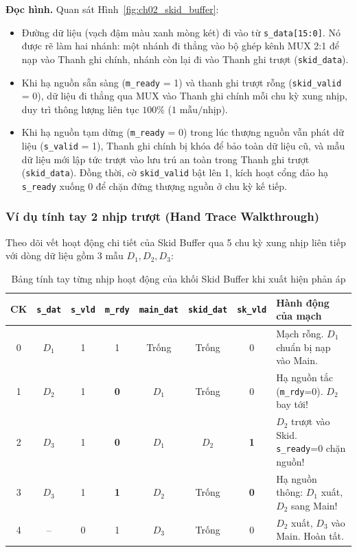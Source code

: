 \textbf{Đọc hình.} Quan sát Hình~\ref{fig:ch02_skid_buffer}:
\begin{itemize}[leftmargin=1.5em, itemsep=2pt]
    \item Đường dữ liệu (vạch đậm màu xanh mòng két) đi vào từ \texttt{s\_data[15:0]}. Nó được rẽ làm hai nhánh: một nhánh đi thẳng vào bộ ghép kênh MUX 2:1 để nạp vào Thanh ghi chính, nhánh còn lại đi vào Thanh ghi trượt (\texttt{skid\_data}).
    \item Khi hạ nguồn sẵn sàng (\texttt{m\_ready} = 1) và thanh ghi trượt rỗng (\texttt{skid\_valid} = 0), dữ liệu đi thẳng qua MUX vào Thanh ghi chính mỗi chu kỳ xung nhịp, duy trì thông lượng liên tục $100\%$ ($1\text{ mẫu/nhịp}$).
    \item Khi hạ nguồn tạm dừng (\texttt{m\_ready} = 0) trong lúc thượng nguồn vẫn phát dữ liệu (\texttt{s\_valid} = 1), Thanh ghi chính bị khóa để bảo toàn dữ liệu cũ, và mẫu dữ liệu mới lập tức trượt vào lưu trú an toàn trong Thanh ghi trượt (\texttt{skid\_data}). Đồng thời, cờ \texttt{skid\_valid} bật lên 1, kích hoạt cổng đảo hạ \texttt{s\_ready} xuống 0 để chặn đứng thượng nguồn ở chu kỳ kế tiếp.
\end{itemize}

\subsubsection*{Ví dụ tính tay 2 nhịp trượt (Hand Trace Walkthrough)}
Theo dõi vết hoạt động chi tiết của Skid Buffer qua 5 chu kỳ xung nhịp liên tiếp với dòng dữ liệu gồm 3 mẫu $D_1, D_2, D_3$:

\begin{table}[htbp]
\centering
\footnotesize
\setlength{\tabcolsep}{3.5pt}
\caption{Bảng tính tay từng nhịp hoạt động của khối Skid Buffer khi xuất hiện phản áp}
\label{tab:ch02_skid_trace}
\begin{tabular}{cccccccp{4.8cm}}
\toprule
CK & \texttt{s\_dat} & \texttt{s\_vld} & \texttt{m\_rdy} & \texttt{main\_dat} & \texttt{skid\_dat} & \texttt{sk\_vld} & Hành động của mạch \\
\midrule
0 & $D_1$ & 1 & 1 & Trống & Trống & 0 & Mạch rỗng. $D_1$ chuẩn bị nạp vào Main. \\
1 & $D_2$ & 1 & \textbf{0} & $D_1$ & Trống & 0 & Hạ nguồn tắc (\texttt{m\_rdy}=0). $D_2$ bay tới! \\
2 & $D_3$ & 1 & \textbf{0} & $D_1$ & \textbf{$D_2$} & \textbf{1} & $D_2$ trượt vào Skid. \texttt{s\_ready}=0 chặn nguồn! \\
3 & $D_3$ & 1 & \textbf{1} & \textbf{$D_2$} & Trống & \textbf{0} & Hạ nguồn thông: $D_1$ xuất, $D_2$ sang Main! \\
4 & -- & 0 & 1 & $D_3$ & Trống & 0 & $D_2$ xuất, $D_3$ vào Main. Hoàn tất. \\
\bottomrule
\end{tabular}
\end{table}

